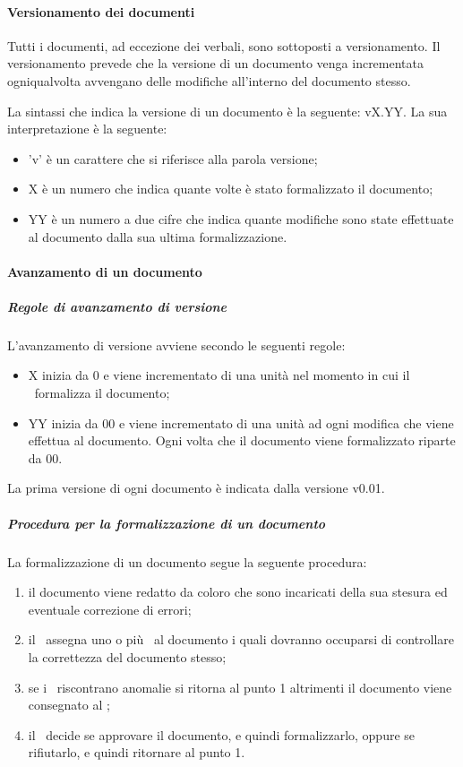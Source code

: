 \documentclass[../NormeProgetto.tex]{subfiles}
\begin{document}
	\paragraph{Versionamento dei documenti} \label{sec:Versionamento dei documenti}
	Tutti i documenti, ad eccezione dei verbali, sono sottoposti a versionamento. Il versionamento prevede che la versione di un documento venga incrementata ogniqualvolta avvengano delle modifiche all'interno del documento stesso.
	
	La sintassi che indica la versione di un documento è la seguente: vX.YY. La sua interpretazione è la seguente:
	\begin{itemize}
		\item 'v' è un carattere che si riferisce alla parola versione;
		\item X è un numero che indica quante volte è stato formalizzato il documento;
		\item YY è un numero a due cifre che indica quante modifiche sono state effettuate al documento dalla sua ultima formalizzazione.
	\end{itemize}
	\paragraph{Avanzamento di un documento} 
		\subparagraph{Regole di avanzamento di versione}
		L'avanzamento di versione avviene secondo le seguenti regole:
		\begin{itemize}
			\item X inizia da 0 e viene incrementato di una unità nel momento in cui il \responsabilediprogetto\ formalizza il documento;
			\item YY inizia da 00 e viene incrementato di una unità ad ogni modifica che viene effettua al documento. Ogni volta che il documento viene formalizzato riparte da 00.
		\end{itemize}
		La prima versione di ogni documento è indicata dalla versione v0.01.		
		
		\subparagraph{Procedura per la formalizzazione di un documento}
		La formalizzazione di un documento segue la seguente procedura:
		\begin{enumerate}
			\item il documento viene redatto da coloro che sono incaricati della sua stesura ed eventuale correzione di errori;
			\item il \responsabilediprogetto\ assegna uno o più \verificatori\ al documento i quali dovranno occuparsi di controllare la correttezza del documento stesso;
			\item se i \verificatori\ riscontrano anomalie si ritorna al punto 1 altrimenti il documento viene consegnato al \responsabilediprogetto;
			\item il \responsabilediprogetto\ decide se approvare il documento, e quindi formalizzarlo, oppure se rifiutarlo, e quindi ritornare al punto 1.
		\end{enumerate}
\end{document}

